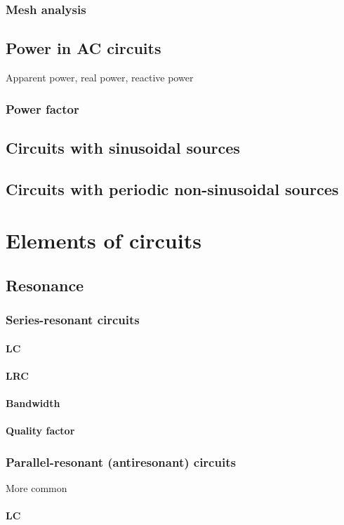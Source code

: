 \documentclass{report}
\begin{document}
\subsection{Mesh analysis}
\section{Power in AC circuits}
Apparent power, real power, reactive power
\subsection{Power factor}
\section{Circuits with sinusoidal sources}
\section{Circuits with periodic non-sinusoidal sources}

\chapter{Elements of circuits}
\section{Resonance}
\subsection{Series-resonant circuits}
\subsubsection{LC}
\subsubsection{LRC}
\subsubsection{Bandwidth}
\subsubsection{Quality factor}
\subsection{Parallel-resonant (antiresonant) circuits}
More common
\subsubsection{LC}
\end{document}
